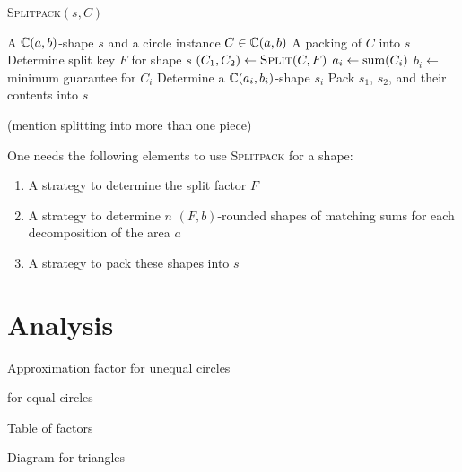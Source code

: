 \documentclass[a4paper,style=print,bibliography=totoc,nexus,lnum,extramargin]{tubsbook}
\begin{document}
\begin{algorithm}
    \caption{\textsc{Splitpack}$(s,C)$}
    \begin{algorithmic}
        \Require A $\mathbb{C}(a,b)$-shape $s$ and a circle instance $C \in \mathbb{C}(a,b)$
        \Ensure A packing of $C$ into $s$
        \State Determine split key $F$ for shape $s$
        \State $(C_1, C_2) \gets \textsc{Split}(C,F)$
            \State $a_i \gets \operatorname{sum}(C_i)$
            \State $b_i \gets$ minimum guarantee for $C_i$
            \State Determine a $\mathbb{C}(a_i, b_i)$-shape $s_i$
            \State {}
        \EndFor
        \State Pack $s_1$, $s_2$, and their contents into $s$
    \end{algorithmic}
\end{algorithm}

(mention splitting into more than one piece)

One needs the following elements to use \textsc{Splitpack} for a shape:

\begin{enumerate}
    \item A strategy to determine the split factor $F$
    \item A strategy to determine $n$ $(F,b)$-rounded shapes of matching sums for each decomposition of the area $a$
    \item A strategy to pack these shapes into $s$
\end{enumerate}



\section{Analysis}

Approximation factor for unequal circles

for equal circles

Table of factors

Diagram for triangles
\end{document}
